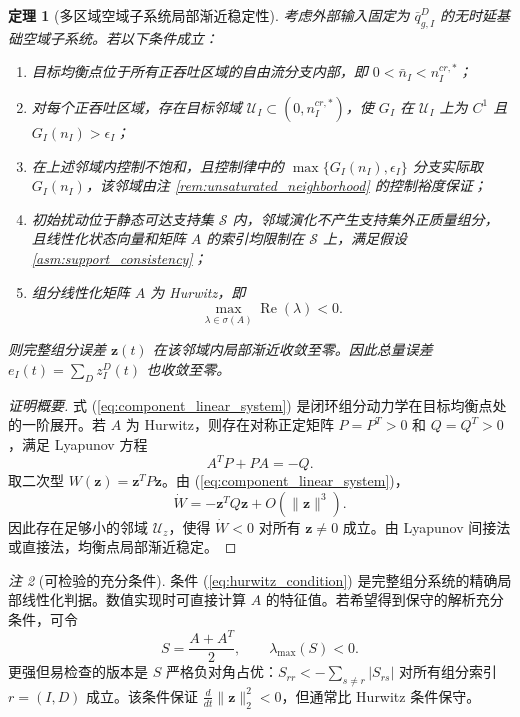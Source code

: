 \documentclass[a4paper,12pt]{article}
\theoremstyle{plain}
\newtheorem{theorem}{定理}[section]
\theoremstyle{definition}
\theoremstyle{remark}
\newtheorem{remark}[theorem]{注}
\begin{document}
\begin{theorem}[多区域空域子系统局部渐近稳定性]\label{thm:multi_region_stability}
考虑外部输入固定为 $\bar q_{g,I}^D$ 的无时延基础空域子系统。若以下条件成立：
\begin{enumerate}
    \item 目标均衡点位于所有正吞吐区域的自由流分支内部，即 $0<\bar n_I<n_I^{cr,*}$；
    \item 对每个正吞吐区域，存在目标邻域 $\mathcal U_I\subset(0,n_I^{cr,*})$，使 $G_I$ 在 $\mathcal U_I$ 上为 $C^1$ 且 $G_I(n_I)>\epsilon_I$；
    \item 在上述邻域内控制不饱和，且控制律中的 $\max\{G_I(n_I),\epsilon_I\}$ 分支实际取 $G_I(n_I)$，该邻域由注 \ref{rem:unsaturated_neighborhood} 的控制裕度保证；
    \item 初始扰动位于静态可达支持集 $\mathcal S$ 内，邻域演化不产生支持集外正质量组分，且线性化状态向量和矩阵 $A$ 的索引均限制在 $\mathcal S$ 上，满足假设 \ref{asm:support_consistency}；
    \item 组分线性化矩阵 $A$ 为 Hurwitz，即
    \begin{equation}\label{eq:hurwitz_condition}
        \max_{\lambda\in\sigma(A)}\operatorname{Re}(\lambda)<0 .
    \end{equation}
\end{enumerate}
则完整组分误差 $\bm z(t)$ 在该邻域内局部渐近收敛至零。因此总量误差 $e_I(t)=\sum_D z_I^D(t)$ 也收敛至零。
\end{theorem}

\begin{proof}[证明概要]
式 (\ref{eq:component_linear_system}) 是闭环组分动力学在目标均衡点处的一阶展开。若 $A$ 为 Hurwitz，则存在对称正定矩阵 $P=P^T>0$ 和 $Q=Q^T>0$，满足 Lyapunov 方程
\begin{equation}\label{eq:component_lyapunov}
    A^T P+PA=-Q .
\end{equation}
取二次型 $W(\bm z)=\bm z^T P\bm z$。由 (\ref{eq:component_linear_system})，
\begin{equation}
    \dot W
    =
    -\bm z^T Q\bm z+O(\|\bm z\|^3).
\end{equation}
因此存在足够小的邻域 $\mathcal U_z$，使得 $\dot W<0$ 对所有 $\bm z\ne0$ 成立。由 Lyapunov 间接法或直接法，均衡点局部渐近稳定。
\end{proof}

\begin{remark}[可检验的充分条件]\label{rem:diagonal_dominance}
条件 (\ref{eq:hurwitz_condition}) 是完整组分系统的精确局部线性化判据。数值实现时可直接计算 $A$ 的特征值。若希望得到保守的解析充分条件，可令
\begin{equation}\label{eq:symmetrized_condition}
    S=\frac{A+A^T}{2},\qquad \lambda_{\max}(S)<0 .
\end{equation}
更强但易检查的版本是 $S$ 严格负对角占优：$S_{rr}<-\sum_{s\ne r}|S_{rs}|$ 对所有组分索引 $r=(I,D)$ 成立。该条件保证 $\frac{d}{dt}\|\bm z\|_2^2<0$，但通常比 Hurwitz 条件保守。
\end{remark}
\end{document}

